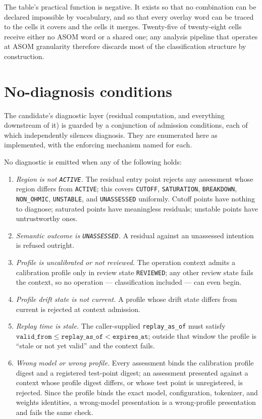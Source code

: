 \begin{remark}\label{ch07:rem:table-use}
The table's practical function is negative. It exists so that no
combination can be declared impossible by vocabulary, and so that every
overlay word can be traced to the cells it covers and the cells it merges.
Twenty-five of twenty-eight cells receive either no ASOM word or a shared
one; any analysis pipeline that operates at ASOM granularity therefore
discards most of the classification structure by construction.
\end{remark}

\section{No-diagnosis conditions}\label{ch07:sec:nodiag}

The candidate's diagnostic layer (residual computation, and everything
downstream of it) is guarded by a conjunction of admission conditions, each
of which independently silences diagnosis. They are enumerated here as
implemented, with the enforcing mechanism named for each.

\begin{ruleenv}\label{ch07:rule:nodiag}
No diagnostic is emitted when any of the following holds:
\begin{enumerate}
\item \emph{Region is not \texttt{ACTIVE}.} The residual entry point
rejects any assessment whose region differs from \texttt{ACTIVE}; this
covers \texttt{CUTOFF}, \texttt{SATURATION}, \texttt{BREAKDOWN},
\texttt{NON\_OHMIC}, \texttt{UNSTABLE}, and \texttt{UNASSESSED} uniformly.
Cutoff points have nothing to diagnose; saturated points have meaningless
residuals; unstable points have untrustworthy ones.
\item \emph{Semantic outcome is \texttt{UNASSESSED}.} A residual against an
unassessed intention is refused outright.
\item \emph{Profile is uncalibrated or not reviewed.} The operation context
admits a calibration profile only in review state \texttt{REVIEWED}; any
other review state fails the context, so no operation --- classification
included --- can even begin.
\item \emph{Profile drift state is not current.} A profile whose drift
state differs from current is rejected at context admission.
\item \emph{Replay time is stale.} The caller-supplied \texttt{replay\_as\_of}
must satisfy $\texttt{valid\_from} \le \texttt{replay\_as\_of} <
\texttt{expires\_at}$; outside that window the profile is ``stale or not yet
valid'' and the context fails.
\item \emph{Wrong model or wrong profile.} Every assessment binds the
calibration profile digest and a registered test-point digest; an
assessment presented against a context whose profile digest differs, or
whose test point is unregistered, is rejected. Since the profile binds the
exact model, configuration, tokenizer, and weights identities, a wrong-model
presentation is a wrong-profile presentation and fails the same check.
\end{enumerate}
\end{ruleenv}


